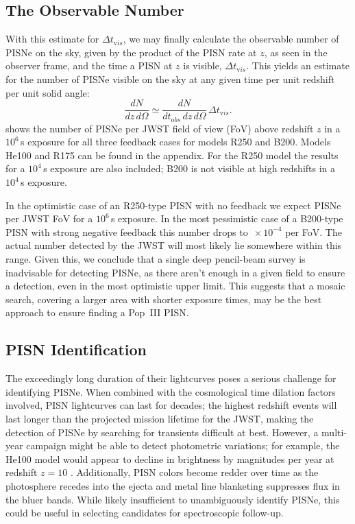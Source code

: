 \documentclass[../thesis.tex]{subfiles}
\begin{document}
\subsection{The Observable Number}
 With this estimate for $\Delta t_{\mathrm vis}$, we may finally calculate
 the observable number of PISNe on the sky, given by the product of
 the PISN rate at $z$, as seen in the observer frame, and the time a
 PISN at $z$ is visible, $\Delta t_{\mathrm vis}$. This yields an estimate
 for the number of PISNe visible on the sky at any given time per unit
 redshift per unit solid angle:
\begin{equation} 
\frac{dN}{dz\,d\Omega} \simeq \frac{dN}{dt_{\mathrm
    obs}\,dz\,d\Omega}\,\Delta t_{\mathrm vis}.
\end{equation}
 shows the number of PISNe per JWST field of view
(FoV) above redshift $z$ in a $10^6\,$s exposure for all three
feedback cases for models R250 and B200. Models He100 and R175 can be
found in the appendix.  For the R250 model the results for a $10^4\,$s
exposure are also included; B200 is not visible at high redshifts in a
$10^4\,$s exposure.

In the optimistic case of an R250-type PISN with no feedback we expect
 PISNe per JWST FoV for a $10^6\,$s exposure.  In the most
pessimistic case of a B200-type PISN with strong negative feedback
this number drops to $\,\times10^{-4}$ per FoV.  The actual
number detected by the JWST will most likely lie somewhere within this
range. Given this, we conclude that a single deep pencil-beam survey
is inadvisable for detecting PISNe, as there aren't enough in a given
field to ensure a detection, even in the most optimistic upper limit.
This suggests that a mosaic search, covering a larger area with shorter
exposure times, may be the best approach to ensure finding a Pop~III
PISN.

\subsection{PISN Identification}
The exceedingly long duration of their lightcurves poses a serious
challenge for identifying PISNe.  When combined with the cosmological
time dilation factors involved, PISN lightcurves can last for decades;
the highest redshift events will last longer than the projected
mission lifetime for the JWST, making the detection of PISNe by
searching for transients difficult at best.  However, a multi-year
campaign might be able to detect photometric variations; for example,
the He100 model would appear to decline in brightness by 
magnitudes per year at redshift $z=10$
\citep{KasenWoosleyHeger2011}. Additionally, PISN colors become redder
over time as the photosphere recedes into the ejecta and metal line
blanketing suppresses flux in the bluer bands.  While likely
insufficient to unambiguously identify PISNe, this could be useful in
selecting candidates for spectroscopic follow-up.
\end{document}
